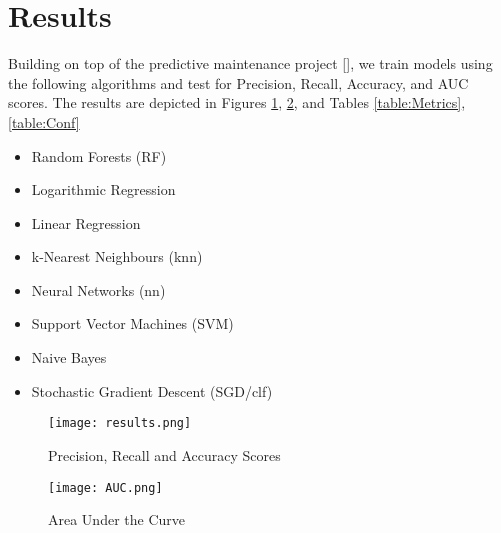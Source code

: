 \section{Results}
Building on top of the predictive maintenance project [], we train models using the following algorithms and test for Precision, Recall, Accuracy, and AUC scores.
The results are depicted in Figures \ref{fig:Metric plot}, \ref{fig:AUC}, and Tables \ref{table:Metrics}, \ref{table:Conf}
\begin{itemize}
    \item Random Forests (RF)
    \item Logarithmic Regression
    \item Linear Regression
    \item k-Nearest Neighbours (knn)
    \item Neural Networks (nn)
    \item Support Vector Machines (SVM)
    \item Naive Bayes
    \item Stochastic Gradient Descent (SGD/clf)
\end{itemize}

\begin{figure}[H]
    \texttt{[image: results.png]}
    \centering
    \caption{Precision, Recall and Accuracy Scores}
    \label{fig:Metric plot}
\end{figure}

\begin{figure}[H]
    \texttt{[image: AUC.png]}
    \centering
    \caption{Area Under the Curve}
    \label{fig:AUC}
\end{figure}

